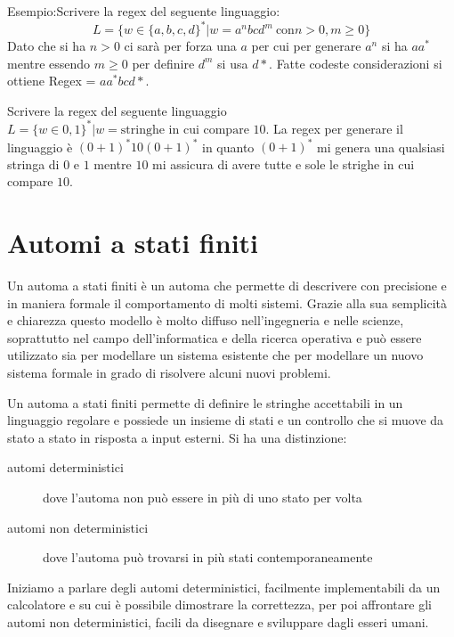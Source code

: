 \documentclass[a4paper]{book}
\theoremstyle{definition}%
\begin{document}
Esempio:Scrivere la regex del seguente linguaggio:
\[ L = \{ w \in \{a,b,c,d\}^* | w = a^n bcd^m \ \text{con} n > 0, m\geq 0\} \]
Dato che si ha $n > 0$ ci sarà per forza una $a$ per cui per generare $a^n$ si ha $aa^*$ mentre essendo $m \geq 0$ per
definire $d^m$ si usa $d*$.\newline
Fatte codeste considerazioni si ottiene Regex = $aa^*bcd*$.

Scrivere la regex del seguente linguaggio $L = \{ w \in {0,1\}^* | w = \text{stringhe in cui compare 10}}$.\newline
  La regex per generare il linguaggio è $(0+1)^*10(0+1)^*$ in quanto $(0+1)^*$ mi genera una qualsiasi stringa di $0$ e $1$ mentre
  $10$ mi assicura di avere tutte e sole le strighe in cui compare $10$.

\chapter{Automi a stati finiti}
Un automa a stati finiti è un automa che permette di descrivere con precisione e in maniera formale il comportamento di molti sistemi.\newline
Grazie alla sua semplicità e chiarezza questo modello è molto diffuso nell'ingegneria e nelle scienze, soprattutto nel campo dell'informatica
e della ricerca operativa e può essere utilizzato sia per modellare un sistema esistente che per modellare un nuovo sistema formale
in grado di risolvere alcuni nuovi problemi.

Un automa a stati finiti permette di definire le stringhe accettabili in un linguaggio regolare
e possiede un insieme di stati e un controllo che si muove da stato a stato in risposta a input esterni.\newline
 Si ha una distinzione:
\begin{description}
\item [automi deterministici] dove l'automa non può essere in più di uno stato per volta
\item [automi non deterministici] dove l'automa può trovarsi in più stati contemporaneamente
\end{description}
Iniziamo a parlare degli automi deterministici, facilmente implementabili da un calcolatore
e su cui è possibile dimostrare la correttezza, per poi affrontare gli automi non deterministici,
facili da disegnare e sviluppare dagli esseri umani.
\end{document}
